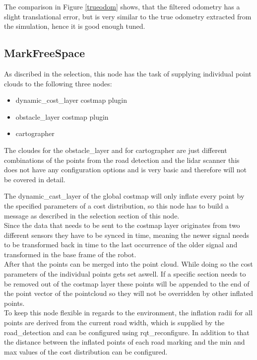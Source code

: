 The comparison in Figure \ref{trueodom} shows, that the filtered odometry has a slight translational error, but is very similar to the true odometry extracted from the simulation, hence it is good enough tuned. 
\subsection{MarkFreeSpace}

As discribed in the selection, this node has the task of supplying individual point clouds to the following three nodes:

\begin{itemize}
	\item dynamic\_cost\_layer costmap plugin
	\item obstacle\_layer costmap plugin
	\item cartographer
\end{itemize}

The cloudes for the obstacle\_layer and for cartographer are just different combinations of the points from the road detection and the lidar scanner this does not have any configuration options and is very basic and therefore will not be covered in detail.

The dynamic\_cast\_layer of the global costmap will only inflate every point by the specified parameters of a cost distribution, so this node has to build a message as described in the selection section of this node.\\

Since the data that needs to be sent to the costmap layer originates from two different sensors they have to be synced in time, meaning the newer signal needs to be transformed back in time to the last occurrence of the older signal and transformed in the base frame of the robot.\\

After that the points can be merged into the point cloud. While doing so the cost parameters of the individual points gets set aswell. If a specific section needs to be removed out of the costmap layer these points will be appended to the end of the point vector of the pointcloud so they will not be overridden by other inflated points.\\

To keep this node flexible in regards to the environment, the inflation radii for all points are derived from the current road width, which is supplied by the road\_detection and can be configured using rqt\_reconfigure. 
In addition to that the distance between the inflated points of each road marking and the min and max values of the cost distribution can be configured.


